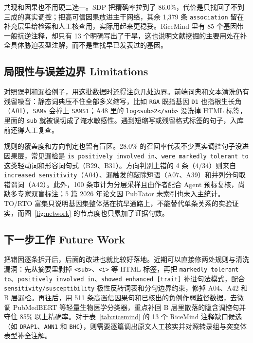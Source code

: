 \documentclass[conference]{IEEEtran}
\begin{document}
共现和因果也不用硬二选一。SDP 把精确率拉到了 86.0\%，代价是只找回了不到三成的真实调控；把高可信因果放进主干网络，其余 1,379 条 \texttt{association} 留在补充层里给检索和人工核查用，实际用起来更稳妥。RiceMind 里有 85 个基因带一般抗逆注释，却只有 13 个明确写出了干旱，这也说明文献挖掘的主要用处在补全具体胁迫表型注解，而不是重找早已发表过的基因。

\subsection{局限性与误差边界 Limitations}
对照误判和漏检例子，用这批数据时还得注意几处边界。前端词典和文本清洗仍有残留噪音：静态词典压不住全部多义缩写，比如 \texttt{RGA} 既指基因 \texttt{D1} 也指根生长角（A01），\texttt{SAMs} 会撞上 \texttt{SAMS1}；A48 里的 \texttt{log<sub>2</sub>} 没洗掉 HTML 标签，里面的 \texttt{sub} 就被误切成了淹水敏感性。遇到短缩写或残留格式标签的句子，入库前还得人工复查。

规则的覆盖度和方向判定也留有盲区。28.0\% 的召回率代表不少真实调控句子没进因果层，常见漏检是 \texttt{is positively involved in}、\texttt{were markedly tolerant to} 这类轻动词和形容词句式（B29、B31）。方向判别上错的 4 条（4/34）则来自 \texttt{increased sensitivity}（A04）、漏触发的敲除短语（A07、A39）和并列分句取错谓词（A42）。此外，100 条审计为分层采样且由作者配合 Agent 预标复核，尚缺多专家双盲标注；5 篇 2026 年论文因 PubTator 未索引也未入主统计。TO/RTO 富集只说明基因集整体落在抗旱通路上，不能替代单条关系的实验证实，而图~\ref{fig:network} 的节点度也只累加了证据句数。

\subsection{下一步工作 Future Work}
把错因逐条拆开后，后面的改进也就比较好落地。近期可以直接修两处规则与清洗漏洞：先从摘要里剥掉 \texttt{<sub>}、\texttt{<i>} 等 HTML 标签，再把 \texttt{markedly tolerant to}、\texttt{positively involved in}、\texttt{showed enhanced [trait]} 补进句法模式，配合 \texttt{sensitivity/susceptibility} 极性反转词表和分句边界约束，修掉 A04、A42 和 B 层漏检。再往后，用 511 条高置信因果句和已核出的负例作弱监督数据，去微调 PubMedBERT 等轻量生物医学分类器，重点补回 B 层里散落的隐含调控句并守住 85\% 以上精确率。对于表~\ref{tab:ricemind} 的 13 个 RiceMind 注释缺口候选（如 \texttt{DRAP1}、\texttt{ANN1} 和 \texttt{BHC}），则需要逐篇调出原文人工核实并对照转录组与突变体表型补全注解。

\end{document}
